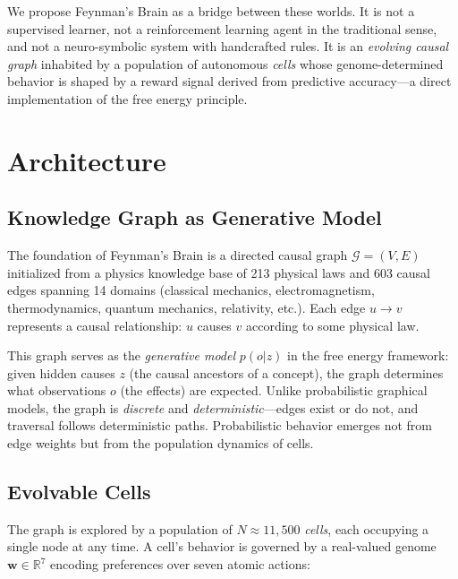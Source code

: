 \documentclass[aps,prl,reprint]{revtex4-2}
\begin{document}
We propose Feynman's Brain as a bridge between these worlds. It is not a
supervised learner, not a reinforcement learning agent in the traditional
sense, and not a neuro-symbolic system with handcrafted rules. It is an
\emph{evolving causal graph} inhabited by a population of autonomous
\emph{cells} whose genome-determined behavior is shaped by a reward signal
derived from predictive accuracy---a direct implementation of the free energy
principle.

\section{Architecture}

\subsection{Knowledge Graph as Generative Model}

The foundation of Feynman's Brain is a directed causal graph $\mathcal{G}
= (V, E)$ initialized from a physics knowledge base of 213 physical laws and
603 causal edges spanning 14 domains (classical mechanics, electromagnetism,
thermodynamics, quantum mechanics, relativity, etc.). Each edge $u \rightarrow
v$ represents a causal relationship: $u$ causes $v$ according to some physical
law.

This graph serves as the \emph{generative model} $p(o|z)$ in the free energy
framework: given hidden causes $z$ (the causal ancestors of a concept), the
graph determines what observations $o$ (the effects) are expected. Unlike
probabilistic graphical models, the graph is \emph{discrete} and
\emph{deterministic}---edges exist or do not, and traversal follows
deterministic paths. Probabilistic behavior emerges not from edge weights but
from the population dynamics of cells.

\subsection{Evolvable Cells}

The graph is explored by a population of $N \approx 11,500$ \emph{cells},
each occupying a single node at any time. A cell's behavior is governed by a
real-valued genome $\mathbf{w} \in \mathbb{R}^7$ encoding preferences over
seven atomic actions:
\end{document}

